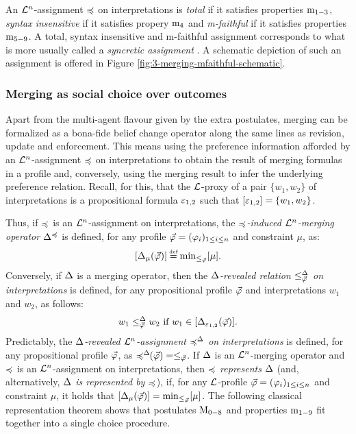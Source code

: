 An $\L^n$-assignment $\as$ on interpretations
is \emph{total} if it satisfies properties $\oom{1-3}$,
\emph{syntax insensitive} if it satisfies propery $\oom{4}$
and \emph{m-faithful} if it satisfies properties $\oom{5-9}$.
A total, syntax insensitive and m-faithful assignment 
corresponds to what is
more usually called a \emph{syncretic assignment} \cite{KoniecznyP02,KoniecznyP11}.
A schematic depiction of such an assignment is offered 
in Figure \ref{fig:3-merging-mfaithful-schematic}.

\subsubsection{Merging as social choice over outcomes}
Apart from the multi-agent flavour given by the extra postulates,
merging can be formalized as a bona-fide belief change operator
along the same lines as revision, update and enforcement.
This means using the preference information afforded by an 
$\L^n$-assignment $\as$ on interpretations to obtain the result
of merging formulas in a profile and, conversely, 
using the merging result to infer the underlying preference relation.
Recall, for this, that the $\L$-proxy of a pair $\{w_1,w_2\}$ of interpretations
is a propositional formula $\px_{1,2}$ such that $[\px_{1,2}]=\{w_1,w_2\}$.

Thus, if $\as$ is an $\L^n$-assignment on interpretations,
the \emph{$\as$-induced $\L^n$-merging operator $\me^{\as}$} is defined,
for any profile $\P=(\phi_i)_{1\le i \le n}$
and constraint $\mu$, as:
$$
	[\me_{\mu}(\P)] \defeq \min_{\le_{\P}}[\mu].
$$
Conversely, if $\me$ is a merging operator,
then the \emph{$\me$-revealed relation $\le_{\P}^{\me}$ on interpretations}
is defined, for any
propositional profile $\P$ and interpretations $w_1$ and $w_2$, 
as follows:
$$
	w_1 \le^{\me}_{\P} w_2~\text{if}~w_1\in[\me_{\px_{1,2}}(\P)].
$$
Predictably, the \emph{$\me$-revealed $\L^n$-assignment $\as^{\me}$ on interpretations}
is defined, for any propositional profile $\P$, as $\as^{\me}\!\!(\P)=\le_{\P}$.
If $\me$ is an $\L^n$-merging operator 
and $\as$ is an $\L^n$-assignment on interpretations,
then \emph{$\as$ represents $\me$}
(and, alternatively, \emph{$\me$ is represented by $\as$}),
if, for any $\L$-profile $\P=(\phi_i)_{1\le i \le n}$ 
and constraint $\mu$,
it holds that 
$[\me_{\mu}(\P)] = \min_{\le_{\P}}[\mu]$.
The following classical  representation theorem 
shows that postulates $\ppm{0-8}$ and properties $\oom{1-9}$
fit together into a single choice procedure.

